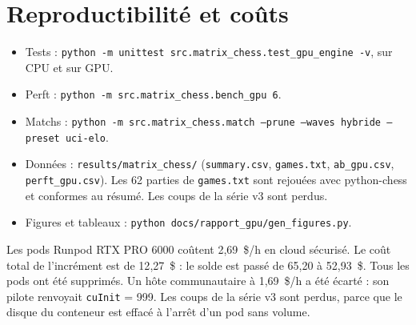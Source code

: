 \documentclass[11pt,a4paper]{article}
\newcommand{\code}[1]{\texttt{#1}}
\begin{document}
\section{Reproductibilité et coûts}
\begin{itemize}
\item Tests : \code{python -m unittest src.matrix\_chess.test\_gpu\_engine -v}, sur CPU et sur
GPU.
\item Perft : \code{python -m src.matrix\_chess.bench\_gpu 6}.
\item Matchs : \code{python -m src.matrix\_chess.match --prune --waves hybride --preset uci-elo}.
\item Données : \code{results/\allowbreak matrix\_chess/} (\code{summary.csv}, \code{games.txt},
\code{ab\_gpu.csv}, \code{perft\_gpu.csv}). Les 62 parties de \code{games.txt} sont rejouées
avec python-chess et conformes au résumé. Les coups de la série v3 sont perdus.
\item Figures et tableaux : \code{python docs/rapport\_gpu/gen\_figures.py}.
\end{itemize}
Les pods Runpod RTX PRO 6000 coûtent 2{,}69~\$/h en cloud sécurisé. Le coût total de
l'incrément est de 12{,}27~\$ : le solde est passé de 65{,}20 à 52{,}93~\$. Tous les pods ont été
supprimés. Un hôte communautaire à
1{,}69~\$/h a été écarté : son pilote renvoyait \code{cuInit} = 999. Les coups de la série v3 sont
perdus, parce que le disque du conteneur est effacé à l'arrêt d'un pod sans volume.
\end{document}
